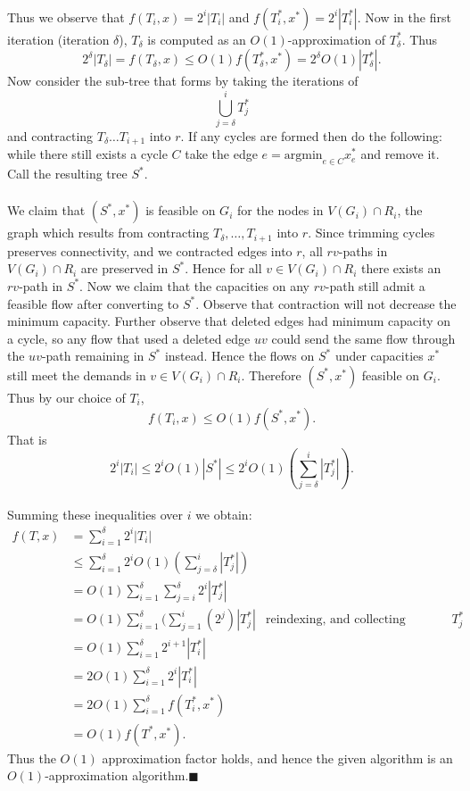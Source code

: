\documentclass[letterpaper,12pt,oneside,onecolumn]{article}
\begin{document}
\paragraph{}
Thus we observe that $f(T_i,x) = 2^i |T_i|$ and $f(T^*_i, x^*) = 2^i |T^*_i|$. Now in the first iteration (iteration $\delta$), $T_\delta$ is computed as an $O(1)$-approximation of $T^*_\delta$. Thus
$$2^\delta |T_\delta| = f(T_\delta, x) \leq O(1) f(T^*_\delta, x^*) = 2^\delta O(1) |T^*_\delta|.$$
Now consider the sub-tree that forms by taking the iterations of $$\bigcup_{j=\delta}^i T^*_j$$
and contracting $T_\delta \dots T_{i+1}$ into $r$. If any cycles are formed then do the following: while there still exists a cycle $C$ take the edge $e = \text{argmin}_{e\in C} x^*_e$ and remove it. Call the resulting tree $S^*$.
\paragraph{}
We claim that $(S^*,x^*)$ is feasible on $G_i$ for the nodes in $V(G_i) \cap R_i$, the graph which results from contracting $T_\delta, \dots, T_{i+1}$ into $r$. Since trimming cycles preserves connectivity, and we contracted edges into $r$, all $rv$-paths in $V(G_i) \cap R_i$ are preserved in $S^*$. Hence for all $v \in V(G_i) \cap R_i$ there exists an $rv$-path in $S^*$. Now we claim that the capacities on any $rv$-path still admit a feasible flow after converting to $S^*$. Observe that contraction will not decrease the minimum capacity. Further observe that deleted edges had minimum capacity on a cycle, so any flow that used a deleted edge $uv$ could send the same flow through the $uv$-path remaining in $S^*$ instead. Hence the flows on $S^*$ under capacities $x^*$ still meet the demands in $v \in V(G_i) \cap R_i$. Therefore $(S^*, x^*)$ feasible on $G_i$. Thus by our choice of $T_i$,
$$f(T_i, x) \leq O(1) f(S^*,x^*).$$
That is $$2^i |T_i| \leq 2^i O(1)|S^*| \leq 2^iO(1) (\sum_{j=\delta}^i |T^*_j|).$$
\paragraph{}
Summing these inequalities over $i$ we obtain:
\begin{align*}
f(T,x) &= \sum_{i=1}^\delta 2^i|T_i| \\
&\leq \sum_{i=1}^\delta 2^i O(1)(\sum_{j=\delta}^i |T^*_j|)\\
&= O(1) \sum_{i=1}^\delta \sum_{j=i}^\delta 2^i|T^*_j| \\
&= O(1) \sum_{i=1}^\delta (\sum_{j=1}^{i}(2^j) |T^*_j| &\text{reindexing, and collecting coefficients on each $T^*_j$} \\
&= O(1) \sum_{i=1}^\delta 2^{i+1} |T^*_i| \\
&= 2O(1) \sum_{i=1}^\delta 2^i |T^*_i| \\
&= 2O(1) \sum_{i=1}^\delta f(T^*_i, x^*) \\
&= O(1) f(T^*, x^*).
\end{align*}
Thus the $O(1)$ approximation factor holds, and hence the given algorithm is an $O(1)$-approximation algorithm.$\blacksquare$
\end{document}
